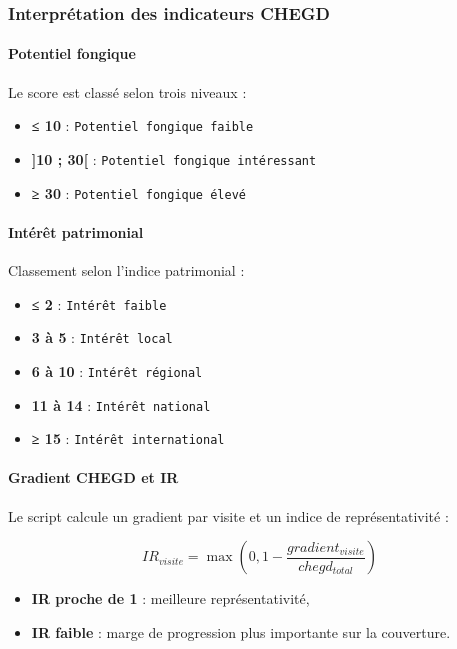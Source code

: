 \subsubsection{Interprétation des indicateurs
CHEGD}\label{interpruxe9tation-des-indicateurs-chegd}

\paragraph{Potentiel fongique}\label{potentiel-fongique}

Le score est classé selon trois niveaux :

\begin{itemize}
\tightlist
\item
  \textbf{≤ 10} : \texttt{Potentiel\ fongique\ faible}
\item
  \textbf{{]}10 ; 30{[}} : \texttt{Potentiel\ fongique\ intéressant}
\item
  \textbf{≥ 30} : \texttt{Potentiel\ fongique\ élevé}
\end{itemize}

\paragraph{Intérêt patrimonial}\label{intuxe9ruxeat-patrimonial}

Classement selon l'indice patrimonial :

\begin{itemize}
\tightlist
\item
  \textbf{≤ 2} : \texttt{Intérêt\ faible}
\item
  \textbf{3 à 5} : \texttt{Intérêt\ local}
\item
  \textbf{6 à 10} : \texttt{Intérêt\ régional}
\item
  \textbf{11 à 14} : \texttt{Intérêt\ national}
\item
  \textbf{≥ 15} : \texttt{Intérêt\ international}
\end{itemize}

\paragraph{Gradient CHEGD et IR}\label{gradient-chegd-et-ir}

Le script calcule un gradient par visite et un indice de
représentativité :

\[IR_{visite} = \max\left(0, 1 - \frac{gradient_{visite}}{chegd_{total}}\right)\]

\begin{itemize}
\tightlist
\item
  \textbf{IR proche de 1} : meilleure représentativité,
\item
  \textbf{IR faible} : marge de progression plus importante sur la
  couverture.
\end{itemize}

